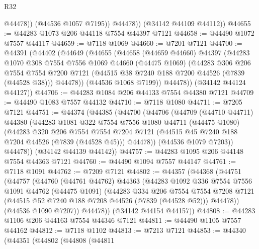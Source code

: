 \begin{lexlean}{R32}
\begin{coremodule}
                @44478))
            (@44536 @1057 @7195))
          @44478))
      (@34142 @44109 @44112))
@44655 := @44283 @1073 @206 @44118 @7554 @44397 @7121
@44658 := @44490 @1072 @7557 @44117
@44659 := @7118 @1069
@44660 := @7201 @7121
@44700 := @44391
    (@44402
      (@44649
        (@44655
          (@44658
            (@44659 @44660)
            @44397
            (@44283
              @1070
              @308
              @7554
              @7556
              @1069
              @44660
              (@44475 @1069)
              (@44283
                @306
                @206
                @7554
                @7554
                @7200
                @7121
                (@44515 @38 @7240 @188 @7200 @44526 (@7839 (@44528 @38)))
                @44478))
            (@44536 @1068 @7199))
          @44478))
      (@34142 @44124 @44127))
@44706 := @44283 @1084 @206 @44133 @7554 @44380 @7121
@44709 := @44490 @1083 @7557 @44132
@44710 := @7118 @1080
@44711 := @7205 @7121
@44751 := @44374
    (@44385
      (@44700
        (@44706
          (@44709
            (@44710 @44711)
            @44380
            (@44283
              @1081
              @322
              @7554
              @7556
              @1080
              @44711
              (@44475 @1080)
              (@44283
                @320
                @206
                @7554
                @7554
                @7204
                @7121
                (@44515 @45 @7240 @188 @7204 @44526 (@7839 (@44528 @45)))
                @44478))
            (@44536 @1079 @7203))
          @44478))
      (@34142 @44139 @44142))
@44757 := @44283 @1095 @206 @44148 @7554 @44363 @7121
@44760 := @44490 @1094 @7557 @44147
@44761 := @7118 @1091
@44762 := @7209 @7121
@44802 := @44357
    (@44368
      (@44751
        (@44757
          (@44760
            (@44761 @44762)
            @44363
            (@44283
              @1092
              @336
              @7554
              @7556
              @1091
              @44762
              (@44475 @1091)
              (@44283
                @334
                @206
                @7554
                @7554
                @7208
                @7121
                (@44515 @52 @7240 @188 @7208 @44526 (@7839 (@44528 @52)))
                @44478))
            (@44536 @1090 @7207))
          @44478))
      (@34142 @44154 @44157))
@44808 := @44283 @1106 @206 @44163 @7554 @44346 @7121
@44811 := @44490 @1105 @7557 @44162
@44812 := @7118 @1102
@44813 := @7213 @7121
@44853 := @44340
    (@44351
      (@44802
        (@44808
          (@44811

\end{coremodule}
\end{lexlean}
